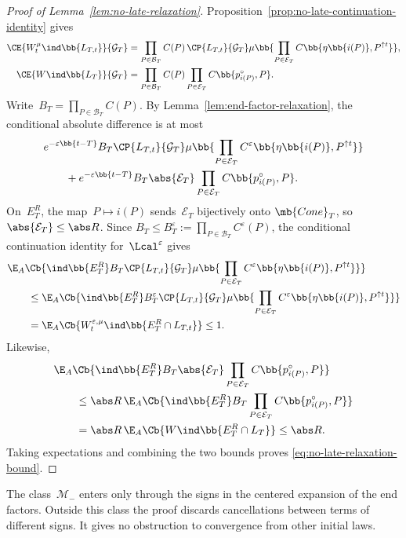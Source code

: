 \begin{proof}[Proof of Lemma~\ref{lem:no-late-relaxation}]
Proposition~\ref{prop:no-late-continuation-identity} gives
\begin{align*}
\CE{W_t^\mu\ind\bb{L_{T,t}}}{\mathcal G_T}
&=
\prod_{P\in\mathcal B_T}C(P)\,
\CP{L_{T,t}}{\mathcal G_T}
\mu\bb{
 \prod_{P\in\mathcal E_T}
 C\bb{\eta\bb{i(P)},P^{\uparrow t}}
},
\\
\CE{W\ind\bb{L_T}}{\mathcal G_T}
&=
\prod_{P\in\mathcal B_T}C(P)
\prod_{P\in\mathcal E_T}C\bb{p_{i(P)}^\circ,P}.
\end{align*}
Write~$B_T=\prod_{P\in\mathcal B_T}C(P)$. By
Lemma~\ref{lem:end-factor-relaxation}, the conditional absolute difference is
at most
\begin{align*}
&e^{-\varepsilon\bb{t-T}}B_T
\CP{L_{T,t}}{\mathcal G_T}
\mu\bb{
 \prod_{P\in\mathcal E_T}
 C^\varepsilon\bb{\eta\bb{i(P)},P^{\uparrow t}}
}
\\
&\qquad+
e^{-\varepsilon\bb{t-T}}B_T\abs{\mathcal E_T}
\prod_{P\in\mathcal E_T}C\bb{p_{i(P)}^\circ,P}.
\end{align*}
On~$E_T^R$, the map~$P\mapsto i(P)$ sends~$\mathcal E_T$ bijectively onto
$\mb{Cone}_T$, so~$\abs{\mathcal E_T}\leq\abs R$. Since
$B_T\leq B_T^\varepsilon:=\prod_{P\in\mathcal B_T}C^\varepsilon(P)$, the
conditional continuation identity for~$\Lcal^\varepsilon$ gives
\begin{align*}
&\E_A\Cb{
 \ind\bb{E_T^R}B_T
 \CP{L_{T,t}}{\mathcal G_T}
 \mu\bb{
  \prod_{P\in\mathcal E_T}
  C^\varepsilon\bb{\eta\bb{i(P)},P^{\uparrow t}}
 }
}
\\
&\qquad\leq
\E_A\Cb{
 \ind\bb{E_T^R}B_T^\varepsilon
 \CP{L_{T,t}}{\mathcal G_T}
 \mu\bb{
  \prod_{P\in\mathcal E_T}
  C^\varepsilon\bb{\eta\bb{i(P)},P^{\uparrow t}}
 }
}
\\
&\qquad=
\E_A\Cb{W_t^{\varepsilon,\mu}\ind\bb{E_T^R\cap L_{T,t}}}
\leq1.
\end{align*}
Likewise,
\begin{align*}
&\E_A\Cb{
 \ind\bb{E_T^R}B_T\abs{\mathcal E_T}
 \prod_{P\in\mathcal E_T}C\bb{p_{i(P)}^\circ,P}
}
\\
&\qquad\leq
\abs R\,
\E_A\Cb{
 \ind\bb{E_T^R}B_T
 \prod_{P\in\mathcal E_T}C\bb{p_{i(P)}^\circ,P}
}
\\
&\qquad=
\abs R\,
\E_A\Cb{W\ind\bb{E_T^R\cap L_T}}
\leq\abs R.
\end{align*}
Taking expectations and combining the two bounds proves
\eqref{eq:no-late-relaxation-bound}.
\end{proof}

The class~$\mathcal M_-$ enters only through the signs in the centered
expansion of the end factors. Outside this class the proof discards
cancellations between terms of different signs. It gives no obstruction to
convergence from other initial laws.
